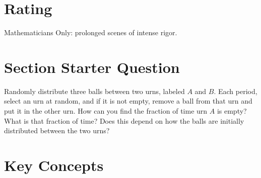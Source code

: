 \documentclass[12pt]{article}
\begin{document}
\myheader \mytitle

\hr


\hr

\usefirefox



\hr

\section*{Rating} %
Mathematicians Only: prolonged scenes of intense rigor.

\hr

\section*{Section Starter Question}

Randomly distribute three balls between two urns, labeled \( A \) and \(
B \).  Each period, select an urn at random, and if it is not empty,
remove a ball from that urn and put it in the other urn.  How can you
find the fraction of time urn \( A \) is empty?  What is that fraction
of time?  Does this depend on how the balls are initially distributed
between the two urns?

\hr

\section*{Key Concepts}
\end{document}
